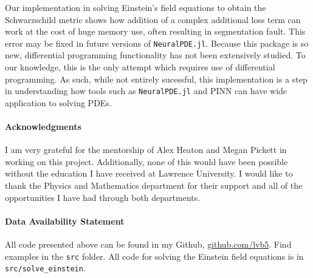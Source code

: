 \documentclass{CUP-JNL-DTM}%
\theoremstyle{definition}
\numberwithin{equation}{section}
\begin{document}
Our implementation in solving Einstein's field equations to obtain the Schwarzschild metric shows how addition of a complex additional loss term can work at the cost of huge memory use, often resulting in segmentation fault. This error may be fixed in future versions of \texttt{NeuralPDE.jl}. Because this package is so new, differential programming functionality has not been extensively studied. To our knowledge, this is the only attempt which requires use of differential programming. As such, while not entirely sucessful, this implementation is a step in understanding how tools such as \texttt{NeuralPDE.jl} and PINN can have wide application to solving PDEs. 


\begin{Backmatter}

\paragraph{Acknowledgments}

I am very grateful for the mentorship of Alex Heaton and Megan Pickett in working on this project. Additionally, none of this would have been possible without the education I have received at Lawrence University. I would like to thank the Physics and Mathematics department for their support and all of the opportunities I have had through both departments. 

\paragraph{Data Availability Statement} All code presented above can be found in my Github, \href{https://github.com/lvb5/solve\_PDEs\_with\_PINN}{github.com/lvb5}. Find examples in the \texttt{src} folder. All code for solving the Einstein field equations is in \texttt{src/solve\_einstein}.  




\end{Backmatter}
\end{document}

